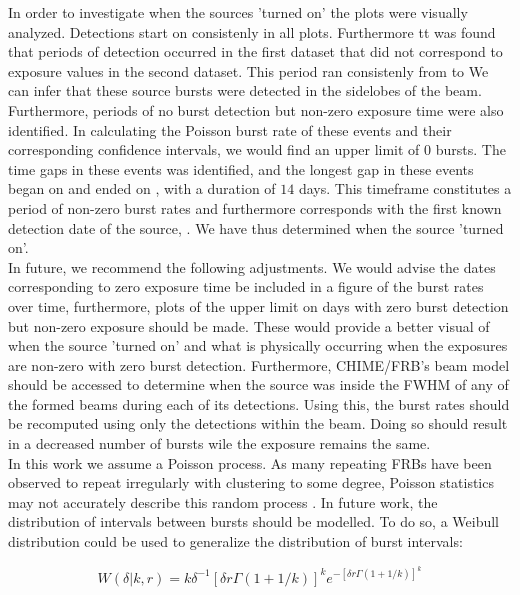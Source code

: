 \documentclass[twocolumn]{aastex631}
\begin{document}
\indent In order to investigate when the sources 'turned on' the plots were visually analyzed. Detections start on  consistenly in all plots. Furthermore tt was found that periods of detection occurred in the first dataset that did not correspond to exposure values in the second dataset. This period ran consistenly from  to  We can infer that these source bursts were detected in the sidelobes of the beam.\\
\indent Furthermore, periods of no burst detection but non-zero exposure time were also identified. In calculating the Poisson burst rate of these events and their corresponding confidence intervals, we would find an upper limit of $0$ bursts. The time gaps in these events was identified, and the longest gap in these events began on  and ended on , with a duration of $14$ days. This timeframe constitutes a period of non-zero burst rates and furthermore corresponds with the first known detection date of the source, . We have thus determined when the source 'turned on'.\\
\indent In future, we recommend the following adjustments. We would advise the dates corresponding to zero exposure time be included in a figure of the burst rates over time, furthermore, plots of the upper limit on days with zero burst detection but non-zero exposure should be made. These would provide a better visual of when the source 'turned on' and what is physically occurring when the exposures are non-zero with zero burst detection. Furthermore, CHIME/FRB's beam model should be accessed to determine when the source was inside the FWHM of any of the formed beams during each of its detections. Using this, the burst rates should be recomputed using only the detections within the beam. Doing so should result in a decreased number of bursts wile the exposure remains the same.\\
\indent In this work we assume a Poisson process. As many repeating FRBs have been observed to repeat irregularly with clustering to some degree, Poisson statistics may not accurately describe this random process \citep{oppermann2018non}. In future work, the distribution of intervals between bursts should be modelled. To do so, a Weibull distribution could be used to generalize the distribution of burst intervals:

\begin{equation}
W(\delta |k, r) = k\delta^{-1}[\delta r \Gamma(1+1/k)]^{k}e^{-[\delta r \Gamma(1+1/k)]^{k}}
\end{equation}
\end{document}
